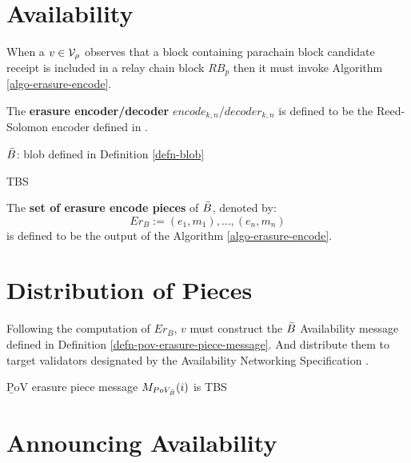 \section{Availability}

When a $v \in \mathcal{V}_\rho$ observes that a block containing parachain block candidate receipt is included in a relay chain block $RB_p$ then it must invoke Algorithm \ref{algo-erasure-encode}.

\begin{definition}
  \label{defn-erasure-encoder-decoder}
  The {\bf erasure encoder/decoder} {\bf $encode_{k,n}/decoder_{k,n}$ } is defined to be the Reed-Solomon encoder defined in \cite{??}.
\end{definition}

\begin{algorithm}
  \caption[]{\sc Erasure-Encode($\blobB$, $n$}
  \label{algo-erasure-encode}
  \begin{algorithmic}[1]
  \Require
    $\blobB$: blob defined in Definition \ref{defn-blob}

    \State TBS
  \end{algorithmic}
\end{algorithm}

\begin{definition}
  \label{defn-erasure-coded-pieces}
  The {\bf set of erasure encode pieces} of $\blobB$, denoted by:
  \[
   Er_B := {(e_1, m_1),...,(e_n,m_n)}
   \]
   is defined to be the output of the Algorithm \ref{algo-erasure-encode}.
\end{definition}

\section{Distribution of Pieces}\label{sect-distribute-piece}
Following the computation of $Er_B$, $v$ must construct the $\blobB$ Availability message defined in Definition \ref{defn-pov-erasure-piece-message}. And distribute them to target validators designated by the Availability Networking Specification \cite{??}.

\begin{definition}
  \label{defn-pov-erasure-piece-message}
        {\b PoV erasure piece message} $M_{PoV_{\bar{B}}}(i)$ is TBS
\end{definition}

\section{Announcing Availability}\label{sect-voting-on-availability}


